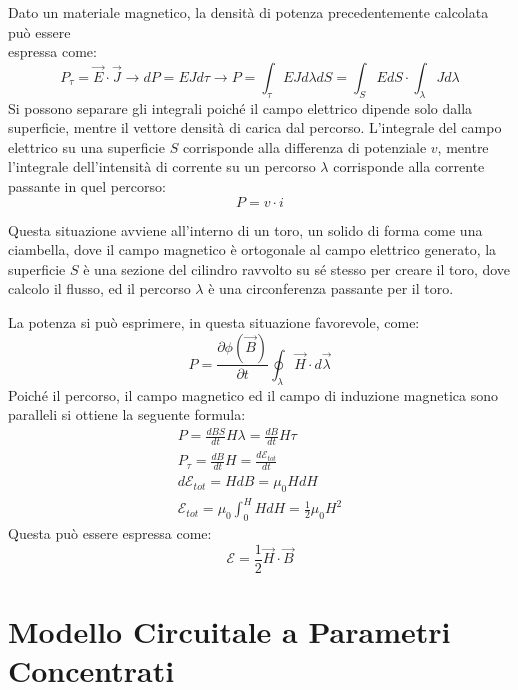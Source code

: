 \documentclass{article}
\numberwithin{equation}{subsection}
\begin{document}
Dato un materiale magnetico, la densità di potenza precedentemente calcolata può essere\\espressa come:
\begin{equation*}
    P_\tau=\vec{E}\cdot\vec{J}\to dP=EJd\tau\to P=\displaystyle\int_{\tau}EJd\lambda dS=\int_{S}EdS\cdot\int_{\lambda}Jd\lambda
\end{equation*}
Si possono separare gli integrali poiché il campo elettrico dipende solo dalla superficie, mentre il vettore densità di carica dal percorso. L'integrale del campo elettrico 
su una superficie $S$ corrisponde alla differenza di potenziale $v$, mentre l'integrale dell'intensità di corrente su un percorso $\lambda$ corrisponde alla corrente passante 
in quel percorso: 
\begin{equation}
    P=v\cdot i
\end{equation}

Questa situazione avviene all'interno di un toro, un solido di forma come una ciambella, dove il campo magnetico è ortogonale al campo elettrico generato, la superficie $S$ 
è una sezione del cilindro ravvolto su sé stesso per creare il toro, dove calcolo il flusso, ed il percorso $\lambda$ è una circonferenza passante per il toro. 

La potenza si può esprimere, in questa situazione favorevole, come:
\begin{equation*}
    P=\displaystyle\frac{\partial \phi(\vec{B})}{\partial t}\oint_{\lambda}\vec{H}\cdot d\vec{\lambda}
\end{equation*}
Poiché il percorso, il campo magnetico ed il campo di induzione magnetica sono paralleli si ottiene la seguente formula:
\begin{gather*}
    P=\displaystyle\frac{dBS}{dt}H\lambda=\frac{dB}{dt}H\tau\\
    P_{\tau}=\displaystyle\frac{dB}{dt}H=\frac{d\mathscr{E}_{tot}}{dt}\\
    d\mathscr{E}_{tot}=HdB=\mu_0HdH\\
    \mathscr{E}_{tot}=\displaystyle\mu_0\int_0^HHdH=\frac{1}{2}\mu_0H^2
\end{gather*}
Questa può essere espressa come:
\begin{equation}
    \mathscr{E}=\displaystyle\frac{1}{2}\vec{H}\cdot\vec{B}
\end{equation}

\clearpage

\section{Modello Circuitale a Parametri Concentrati}
\end{document}
